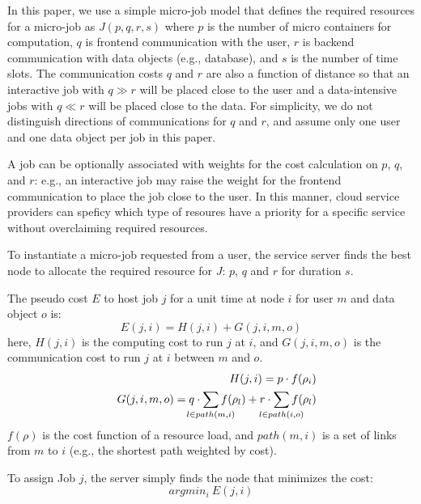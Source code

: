 In this paper, we use a simple micro-job model that defines the
required resources for a micro-job as $J(p, q, r, s)$ where 
$p$ is the number of micro containers for computation, 
$q$ is frontend communication with the user, 
$r$ is backend communication with data objects (e.g., database), and
$s$ is the number of time slots.
The communication costs $q$ and $r$ are also a function of distance so
that an interactive job with $q \gg r$ will be placed close to the
user and a data-intensive jobs with $q \ll r$ will be placed close to
the data.
For simplicity, we do not distinguish directions of
communications for $q$ and $r$, and assume only one user and one data
object per job in this paper.

A job can be optionally associated with weights for the cost
calculation on $p$, $q$, and $r$: e.g., an interactive job may raise
the weight for the frontend communication to place the job close to
the user. In this manner, cloud service providers can speficy which
type of resoures have a priority for a specific service without
overclaiming required resources.

To instantiate a micro-job requested from a user, the service
server finds the best node to allocate the required resource
for $J$: $p$, $q$ and $r$ for duration $s$.

The pseudo cost $E$ to host job $j$ for a unit time at node $i$ for
user $m$ and data object $o$ is:
\begin{equation*}
	E(j, i)     = H(j,i) + G(j,i,m,o)
\end{equation*}
here, $H(j, i)$ is the computing cost to run $j$ at $i$, and
$G(j, i, m, o)$ is the communication cost to run $j$ at $i$
between $m$ and $o$.
\begin{eqnarray*}
&&  H(j,i)      = p \cdot f(\rho_{i}) \\
&&  G(j,i,m,o)  = q \cdot \smashoperator{\sum_{l \in path(m,i)}} f(\rho_{l}) + r \cdot \smashoperator{\sum_{l \in path(i,o)}} f(\rho_{l})
\end{eqnarray*}
$f(\rho)$ is the cost function of a resource load, and $path(m,i)$ is a set
of links from $m$ to $i$ (e.g., the shortest path weighted by cost).

To assign Job $j$, the server simply finds the node that minimizes the
cost:
\begin{equation*}
	argmin_{i} \: E(j, i)
\end{equation*}


